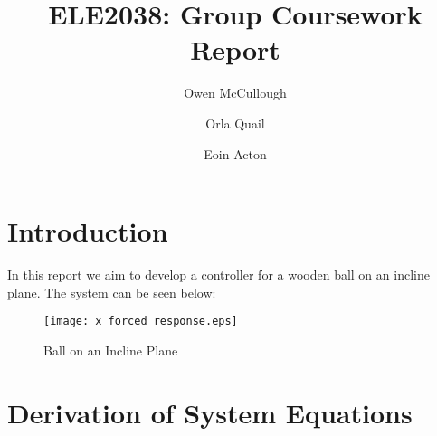 \documentclass[a4paper,10pt,reqno]{amsart}
\title[ELE2038 Coursework]{ELE2038: Group Coursework Report}
\author[O. McCullough]{Owen McCullough}
\author[O. Quail]{Orla Quail}
\author[E. Acton]{Eoin Acton}
\numberwithin{equation}{section}
\begin{document}
\maketitle

\section*{Introduction}
In this report we aim to develop a controller for a wooden ball on an incline plane. The system can be seen below:
\begin{figure}[h]
\centering
\texttt{[image: x\_forced\_response.eps]}
\caption{Ball on an Incline Plane}
\label{fig:system}
\end{figure}

\section{Derivation of System Equations}
\end{document}
